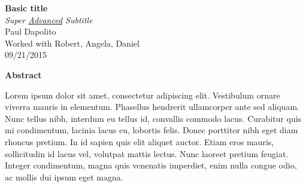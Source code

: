 \documentclass[letterpaper, boxed]{hmcpset}
\begin{document}
\begin{center}
\Large{\textbf{Basic title}} \\ 
\textit{Super \underline{Advanced} Subtitle} \\
\large{Paul Dapolito} \\
\large{Worked with Robert, Angela, Daniel} \\
\large{09/21/2015}
\end{center}
\large \begin{flushleft}
\textbf{Abstract}
\end{flushleft}
\normalsize
Lorem ipsum dolor sit amet, consectetur adipiscing elit. Vestibulum ornare viverra mauris in elementum. Phasellus hendrerit ullamcorper ante sed aliquam. Nunc tellus nibh, interdum eu tellus id, convallis commodo lacus. Curabitur quis mi condimentum, lacinia lacus eu, lobortis felis. Donec porttitor nibh eget diam rhoncus pretium. In id sapien quis elit aliquet auctor. Etiam eros mauris, sollicitudin id lacus vel, volutpat mattis lectus. Nunc laoreet pretium feugiat. Integer condimentum, magna quis venenatis imperdiet, enim nulla congue odio, ac mollis dui ipsum eget magna.
\end{document}
